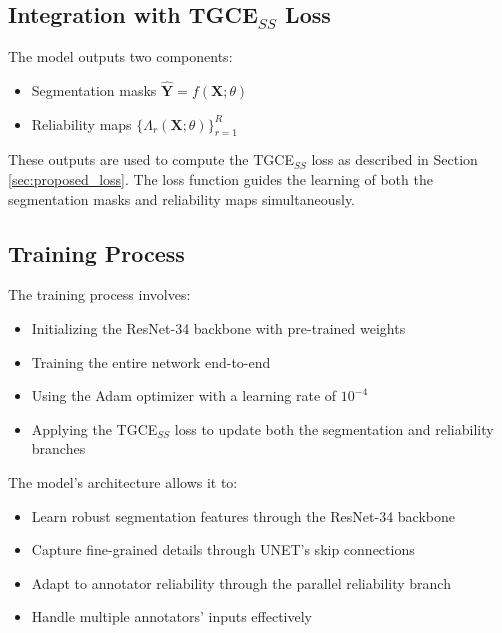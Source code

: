 \subsection{Integration with TGCE$_{SS}$ Loss}

The model outputs two components:

\begin{itemize}
  \item Segmentation masks $\mathbf{\hat{Y}} = f(\mathbf{X};\theta)$
  \item Reliability maps $\{\Lambda_r(\mathbf{X};\theta)\}_{r=1}^R$
\end{itemize}

These outputs are used to compute the TGCE$_{SS}$ loss as described
in Section \ref{sec:proposed_loss}. The loss function guides the
learning of both the segmentation masks and reliability maps simultaneously.

\subsection{Training Process}

The training process involves:

\begin{itemize}
  \item Initializing the ResNet-34 backbone with pre-trained weights
  \item Training the entire network end-to-end
  \item Using the Adam optimizer with a learning rate of $10^{-4}$
  \item Applying the TGCE$_{SS}$ loss to update both the segmentation
    and reliability branches
\end{itemize}

The model's architecture allows it to:
\begin{itemize}
  \item Learn robust segmentation features through the ResNet-34 backbone
  \item Capture fine-grained details through UNET's skip connections
  \item Adapt to annotator reliability through the parallel reliability branch
  \item Handle multiple annotators' inputs effectively
\end{itemize}
